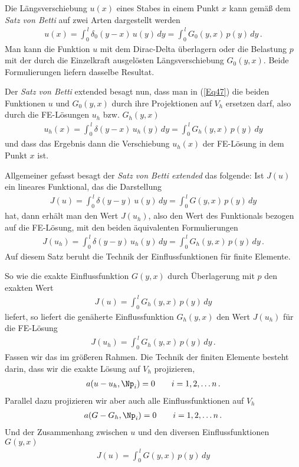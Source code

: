 Die L\"{a}ngsverschiebung $u(x)$ eines Stabes in einem Punkt $x$ kann gem\"{a}{\ss} dem {\em Satz von Betti\/} auf zwei Arten dargestellt werden
\begin{align} \label{Eq47}
u(x) = \int_0^{\,l} \delta_0(y-x)\,u(y)\,dy = \int_0^{\,l} G_0(y,x)\,p(y)\,dy\,.
\end{align}
Man kann die Funktion $u$ mit dem Dirac-Delta \"{u}berlagern oder die Belastung $p$ mit der durch die Einzelkraft ausgel\"{o}sten L\"{a}ngsverschiebung $G_0(y,x)$. Beide Formulierungen liefern dasselbe Resultat.

Der {\em Satz von Betti\/} extended besagt nun, dass man in (\ref{Eq47}) die beiden Funktionen $u$ und $G_0(y,x)$ durch ihre Projektionen auf $V_h$ ersetzen darf, also durch die FE-L\"{o}sungen $u_h$ bzw. $G_h(y,x)$
\begin{align} \label{Eq47}
u_h(x) = \int_0^{\,l} \delta(y-x)\,u_h(y)\,dy = \int_0^{\,l} G_h(y,x)\,p(y)\,dy
\end{align}
und dass das Ergebnis dann die Verschiebung $u_h(x)$ der FE-L\"{o}sung in dem Punkt $x$ ist.

Allgemeiner gefasst besagt der {\em Satz von Betti extended\/} das folgende: Ist $J(u)$ ein lineares Funktional, das die Darstellung
\begin{align}
J(u) = \int_0^{\,l} \delta(y-y)\,u(y)\,dy = \int_0^{\,l} G(y,x)\,p(y)\,dy
\end{align}
hat, dann erh\"{a}lt man den Wert $J(u_h)$, also den Wert des Funktionals bezogen auf die FE-L\"{o}sung, mit den beiden \"{a}quivalenten Formulierungen
\begin{align}
J(u_h) = \int_0^{\,l} \delta(y-y)\,u_h(y)\,dy = \int_0^{\,l} G_h(y,x)\,p(y)\,dy\,.
\end{align}
Auf diesem Satz beruht die Technik der Einflussfunktionen f\"{u}r finite Elemente.

So wie die exakte Einflussfunktion $G(y,x)$ durch \"{U}berlagerung mit $p$ den exakten Wert
\begin{align}
J(u) = \int_0^{\,l} G_h(y,x)\,p(y)\,dy
\end{align}
liefert, so liefert die gen\"{a}herte Einflussfunktion $G_h(y,x)$ den Wert $J(u_h)$ f\"{u}r die FE-L\"{o}sung
\begin{align}
J(u_h) = \int_0^{\,l} G_h(y,x)\,p(y)\,dy\,.
\end{align}
Fassen wir das im gr\"{o}{\ss}eren Rahmen. Die Technik der finiten Elemente besteht darin, dass wir die exakte L\"{o}sung auf $V_h$ projizieren,
\begin{align}
a(u-u_h,\Np_i) = 0 \qquad i = 1,2,\ldots n\,.
\end{align}
Parallel dazu projizieren wir aber auch alle Einflussfunktionen auf $V_h$
\begin{align}
a(G-G_h,\Np_i) = 0 \qquad i = 1,2,\ldots n\,.
\end{align}
Und der Zusammenhang zwischen $u$ und den diversen Einflussfunktionen $G(y,x)$
\begin{align}
J(u) = \int_0^{\,l} G(y,x)\,p(y)\,dy
\end{align}

